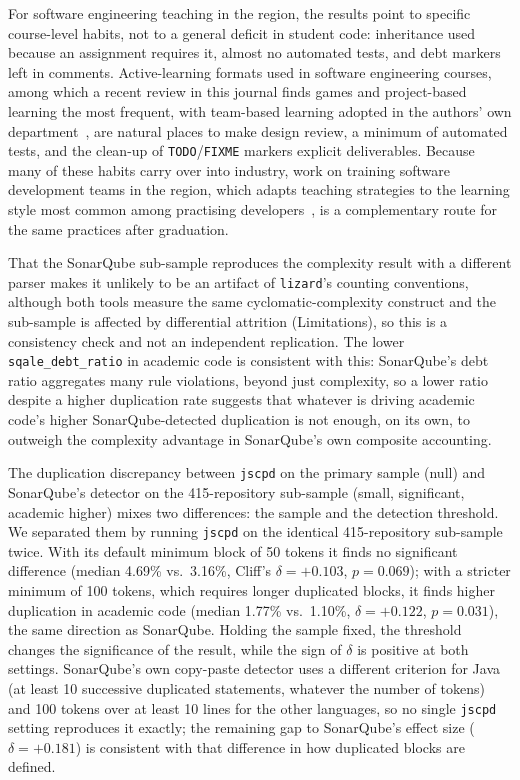 \documentclass{cleiej}
\providecommand{\citep}[1]{\cite{#1}}
\begin{document}
For software engineering teaching in the region, the results point to specific course-level habits, not to a general deficit in student code: inheritance used because an assignment requires it, almost no automated tests, and debt markers left in comments. Active-learning formats used in software engineering courses, among which a recent review in this journal finds games and project-based learning the most frequent, with team-based learning adopted in the authors' own department~\citep{irabedra2025active}, are natural places to make design review, a minimum of automated tests, and the clean-up of \texttt{TODO}/\texttt{FIXME} markers explicit deliverables. Because many of these habits carry over into industry, work on training software development teams in the region, which adapts teaching strategies to the learning style most common among practising developers~\citep{hidalgo2025crosscutting}, is a complementary route for the same practices after graduation.

That the SonarQube sub-sample reproduces the complexity result with a different parser makes it unlikely to be an artifact of \texttt{lizard}'s counting conventions, although both tools measure the same cyclomatic-complexity construct and the sub-sample is affected by differential attrition (Limitations), so this is a consistency check and not an independent replication. The lower \texttt{sqale\_debt\_ratio} in academic code is consistent with this: SonarQube's debt ratio aggregates many rule violations, beyond just complexity, so a lower ratio despite a higher duplication rate suggests that whatever is driving academic code's higher SonarQube-detected duplication is not enough, on its own, to outweigh the complexity advantage in SonarQube's own composite accounting.

The duplication discrepancy between \texttt{jscpd} on the primary sample (null) and SonarQube's detector on the 415-repository sub-sample (small, significant, academic higher) mixes two differences: the sample and the detection threshold. We separated them by running \texttt{jscpd} on the identical 415-repository sub-sample twice. With its default minimum block of 50 tokens it finds no significant difference (median 4.69\% vs.\ 3.16\%, Cliff's $\delta=+0.103$, $p=0.069$); with a stricter minimum of 100 tokens, which requires longer duplicated blocks, it finds higher duplication in academic code (median 1.77\% vs.\ 1.10\%, $\delta=+0.122$, $p=0.031$), the same direction as SonarQube. Holding the sample fixed, the threshold changes the significance of the result, while the sign of $\delta$ is positive at both settings. SonarQube's own copy-paste detector uses a different criterion for Java (at least 10 successive duplicated statements, whatever the number of tokens) and 100 tokens over at least 10 lines for the other languages, so no single \texttt{jscpd} setting reproduces it exactly; the remaining gap to SonarQube's effect size ($\delta=+0.181$) is consistent with that difference in how duplicated blocks are defined.
\end{document}
